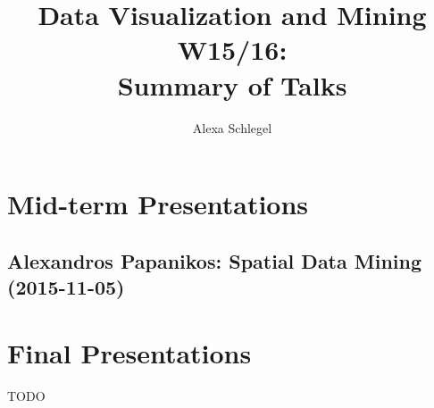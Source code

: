 \documentclass[runningheads,a4paper]{llncs}
\begin{document}
\mainmatter  %

\title{Data Visualization and Mining W15/16:\\ Summary of Talks}


%
%
\author{Alexa Schlegel%
}
%


%
%

\maketitle

\section{Mid-term Presentations}
\subsection{Alexandros Papanikos: Spatial Data Mining (2015-11-05)}


\section{Final Presentations}
TODO
\end{document}
